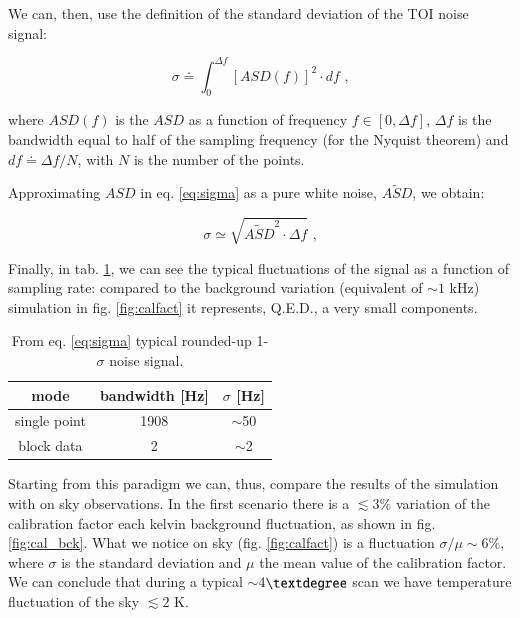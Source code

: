 \documentclass[twocolumn,traditabstract]{aa}\\
\begin{document}
\noindent  We can, then, use the definition of the standard deviation of the TOI noise signal:

\begin{equation}
\sigma \doteq \int_{0}^{\Delta f} [ASD(f)]^2\cdot df \text{ ,}
\label{eq:sigma}
\end{equation}

\noindent where $ASD(f)$ is the $ASD$ as a function of frequency $f\in[0,\Delta f]$, $\Delta f$ is the bandwidth equal to half of the sampling frequency (for the Nyquist theorem) and $df\doteq\Delta f/N$, with $N$ is the number of the points.

\noindent Approximating $ASD$ in eq. \ref{eq:sigma} as a pure white noise, $\tilde{ASD}$, we obtain:

\begin{equation}
\sigma\simeq \sqrt{ \tilde{ASD}^2 \cdot \Delta f } \text{ ,}
\end{equation}

\noindent Finally, in tab. \ref{tab:sigma_sig}, we can see the typical fluctuations of the signal as a function of sampling rate: compared to the background variation (equivalent of $\sim 1$ kHz) simulation in fig. \ref{fig:calfact} it represents, Q.E.D., a very small components.

\begin{table}[htf]
	\footnotesize
	\centering
	\caption{From eq. \ref{eq:sigma} typical rounded-up 1-$\sigma$ noise signal.}
	\begin{tabular}{ccc}
		\toprule
		\textbf{mode} & \textbf{bandwidth [Hz]} & \textbf{$\sigma$ [Hz]} \\
		\toprule
		single point & 1908 & $\sim$50 \\ 
		\midrule 
		block data & 2 & $\sim$2 \\ 
		\bottomrule
	\end{tabular}
	\label{tab:sigma_sig}
\end{table}

Starting from this paradigm we can, thus, compare the results of the simulation with on sky observations. In the first scenario there is a $\lesssim 3\%$ variation of the calibration factor each kelvin background fluctuation, as shown in fig. \ref{fig:cal_bck}. What we notice on sky (fig. \ref{fig:calfact}) is a fluctuation $\sigma/\mu\sim6\%$, where $\sigma$ is the standard deviation and $\mu$ the mean value of the calibration factor. We can conclude that during a typical $\sim$4$\textdegree$ scan we have temperature fluctuation of the sky $\lesssim 2$ K.
\end{document}
